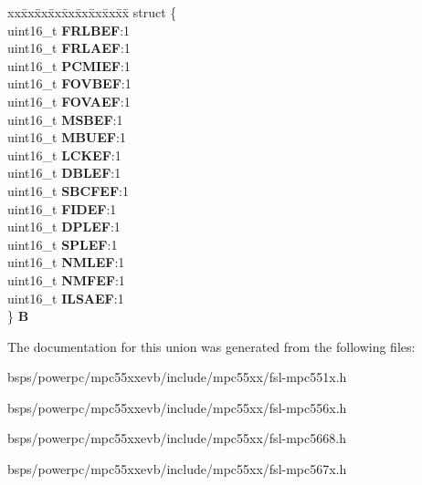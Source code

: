 \begin{DoxyCompactItemize}
\begin{tabbing}
\end{tabbing}\item 
\mbox{\label{unionuCHIERFR_ac79169b3eb1814b6f4c19f9469387107}} 
\begin{tabbing}
xx\=xx\=xx\=xx\=xx\=xx\=xx\=xx\=xx\=\kill
struct \{\\
\>uint16\_t {\bfseries FRLBEF}:1\\
\>uint16\_t {\bfseries FRLAEF}:1\\
\>uint16\_t {\bfseries PCMIEF}:1\\
\>uint16\_t {\bfseries FOVBEF}:1\\
\>uint16\_t {\bfseries FOVAEF}:1\\
\>uint16\_t {\bfseries MSBEF}:1\\
\>uint16\_t {\bfseries MBUEF}:1\\
\>uint16\_t {\bfseries LCKEF}:1\\
\>uint16\_t {\bfseries DBLEF}:1\\
\>uint16\_t {\bfseries SBCFEF}:1\\
\>uint16\_t {\bfseries FIDEF}:1\\
\>uint16\_t {\bfseries DPLEF}:1\\
\>uint16\_t {\bfseries SPLEF}:1\\
\>uint16\_t {\bfseries NMLEF}:1\\
\>uint16\_t {\bfseries NMFEF}:1\\
\>uint16\_t {\bfseries ILSAEF}:1\\
\} {\bfseries B}\\

\end{tabbing}\end{DoxyCompactItemize}


The documentation for this union was generated from the following files\+:\begin{DoxyCompactItemize}
\item 
bsps/powerpc/mpc55xxevb/include/mpc55xx/fsl-\/mpc551x.\+h\item 
bsps/powerpc/mpc55xxevb/include/mpc55xx/fsl-\/mpc556x.\+h\item 
bsps/powerpc/mpc55xxevb/include/mpc55xx/fsl-\/mpc5668.\+h\item 
bsps/powerpc/mpc55xxevb/include/mpc55xx/fsl-\/mpc567x.\+h\end{DoxyCompactItemize}
